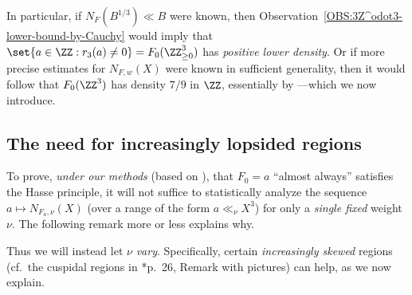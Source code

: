 \documentclass[12pt]{report}
\begin{document}

In particular, if $N_F(B^{1/3})\ll B$ were known,
then Observation~\ref{OBS:3Z^odot3-lower-bound-by-Cauchy}
would imply that $\set{a\in\ZZ: r_3(a)\neq 0}=F_0(\ZZ_{\geq0}^3)$ has \emph{positive lower density}.
Or if more precise estimates for $N_{F,w}(X)$ were known in sufficient generality,
then it would follow that $F_0(\ZZ^3)$ has density $7/9$ in $\ZZ$,
essentially by \cite{diaconu2019admissible}---which we now introduce.

\subsection{The need for increasingly lopsided regions}

To prove,
\emph{under our methods} (based on \cite{diaconu2019admissible}),
that $F_0=a$ ``almost always'' satisfies the Hasse principle,
it will not suffice to statistically analyze
the sequence $a\mapsto N_{F_a,\nu}(X)$ (over a range of the form $a\ll_{\nu}X^3$)
for only a \emph{single fixed} weight $\nu$.
The following remark more or less explains why.

Thus we will instead let $\nu$ \emph{vary}.
Specifically,
certain \emph{increasingly skewed} regions
(cf.~the cuspidal regions in \cite{diaconu2019admissible}*{p.~26, Remark with pictures})
can help,
as we now explain.
\end{document}
